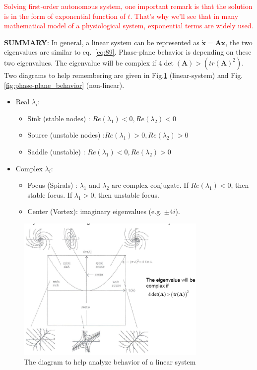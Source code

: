 \begin{framed}

\textcolor{red}{Solving first-order autonomous system, one important
remark is that the solution is in the form of exponential function of
$t$. That's why we'll see that in many mathematical model of a
physiological system, exponential terms are widely used.}
\end{framed}

{\bf SUMMARY}: In general, a linear system can be represented as
$\mathbf{\dot{x} = Ax}$, the two eigenvalues are similar to eq.~\eqref{eq:89}.
Phase-plane behavior is depending on these two eigenvalues. The eigenvalue will
be complex if $4\det(\mathbf{A}) > (tr(\mathbf{A})^2)$.
Two diagrams to help remembering are given in Fig.\ref{fig:dynamic_behavior}
(linear-system) and Fig.\ref{fig:phase-plane_behavior} (non-linear).

\begin{itemize}
\item Real $\lambda_i$:
  \begin{itemize}
    \item Sink (stable nodes) : $Re(\lambda_1)<0, Re(\lambda_2)<0$
    \item Source (unstable nodes) :$Re(\lambda_1)>0, Re(\lambda_2)>0$
    \item Saddle (unstable) : $Re(\lambda_1)<0, Re(\lambda_2)>0$
  \end{itemize}
\item Complex $\lambda_i$: 
  \begin{itemize}
    \item Focus (Spirals) : $\lambda_1$ and $\lambda_2$ are complex conjugate. If
  $Re(\lambda_1)<0$, then stable focus. If $\lambda_1>0$, then
  unstable focus.  
    \item Center (Vortex): imaginary eigenvalues (e.g. $\pm 4i$).
  \end{itemize}
\end{itemize}

\begin{figure}[htb]
  \centerline{\includegraphics[height=7cm]{./images/dynamic_behavior_diagram.eps}}
  \caption{The diagram to help analyze behavior of a linear system}\label{fig:dynamic_behavior}
\end{figure}


